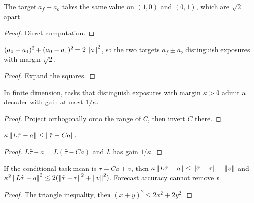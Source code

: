 \begin{lemma}\label{thm:recovery-aggregate}
  \leanok
  The target $a_f+a_o$ takes the same value on $(1,0)$ and $(0,1)$, which are
  $\sqrt2$ apart.
\end{lemma}
\begin{proof}\leanok
  Direct computation.
\end{proof}

\begin{lemma}\label{thm:recovery-diverse}
  \leanok
  $(a_0+a_1)^2+(a_0-a_1)^2=2\left\lVert a\right\rVert^2$, so the two targets $a_f\pm a_o$
  distinguish exposures with margin $\sqrt2$.
\end{lemma}
\begin{proof}\leanok
  Expand the squares.
\end{proof}

\begin{theorem}\label{thm:recovery-decoder}
  \leanok
  In finite dimension, tasks that distinguish exposures with margin
  $\kappa>0$ admit a decoder with gain at most $1/\kappa$.
\end{theorem}
\begin{proof}\leanok
  Project orthogonally onto the range of $C$, then invert $C$ there.
\end{proof}

\begin{lemma}\label{thm:recovery-exposure}
  \leanok
  $\kappa\left\lVert L\hat\tau-a\right\rVert\le\left\lVert\hat\tau-Ca\right\rVert$.
\end{lemma}
\begin{proof}\leanok
  $L\hat\tau-a=L(\hat\tau-Ca)$ and $L$ has gain $1/\kappa$.
\end{proof}

\begin{lemma}\label{thm:recovery-mismatch}
  \leanok
  If the conditional task mean is $\tau=Ca+v$, then
  $\kappa\left\lVert L\hat\tau-a\right\rVert\le\left\lVert\hat\tau-\tau\right\rVert+\left\lVert v\right\rVert$ and
  $\kappa^2\left\lVert L\hat\tau-a\right\rVert^2\le2(\left\lVert\hat\tau-\tau\right\rVert^2+\left\lVert v\right\rVert^2)$.
  Forecast accuracy cannot remove $v$.
\end{lemma}
\begin{proof}\leanok
  The triangle inequality, then $(x+y)^2\le2x^2+2y^2$.
\end{proof}

